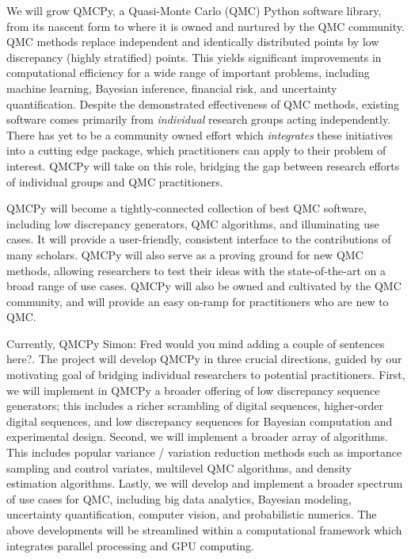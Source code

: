 \documentclass[11pt]{article}%
\newcommand{\SMNote}[1]{{\color{blue}Simon: #1}}
\begin{document}
 We will grow QMCPy, a Quasi-Monte Carlo (QMC) Python software library, from its nascent form to where it is owned and nurtured by the QMC community. QMC methods replace independent and identically distributed points by low discrepancy (highly stratified) points.  This yields significant improvements in computational efficiency for a wide range of important problems, including machine learning, Bayesian inference, financial risk, and uncertainty quantification. Despite the demonstrated effectiveness of QMC methods, existing software comes primarily from \textit{individual} research groups acting independently. There has yet to be a community owned effort which \textit{integrates} these initiatives into a cutting edge package, which practitioners can apply to their problem of interest. QMCPy will take on this role, bridging the gap between research efforts of individual groups and QMC practitioners.

QMCPy will become a tightly-connected collection of best QMC software, including low discrepancy generators, QMC algorithms, and illuminating use cases. It will provide a user-friendly, consistent interface to the contributions of many scholars. QMCPy will also serve as a proving ground for new QMC methods, allowing researchers to test their ideas with the state-of-the-art on a broad range of use cases. QMCPy will also be owned and cultivated by the QMC community, and will provide an easy on-ramp for practitioners who are new to QMC.

Currently, QMCPy \SMNote{Fred would you mind adding a couple of sentences here?}. The project will develop QMCPy in three crucial directions, guided by our motivating goal of bridging individual researchers to potential practitioners. First, we will implement in QMCPy a broader offering of low discrepancy sequence generators; this includes a richer scrambling of digital sequences, higher-order digital sequences, and low discrepancy sequences for Bayesian computation and experimental design. Second, we will implement a broader array of algorithms. This includes popular variance / variation reduction methods such as importance sampling and control variates, multilevel QMC algorithms, and density estimation algorithms. Lastly, we will develop and implement a broader spectrum of use cases for QMC, including big data analytics, Bayesian modeling, uncertainty quantification, computer vision, and probabilistic numerics. The above developments will be streamlined within a computational framework which integrates parallel processing and GPU computing.
\end{document}
